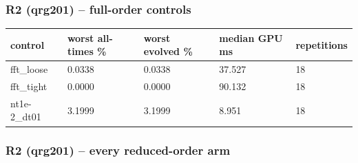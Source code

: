 \documentclass[11pt]{article}
\begin{document}
\subsubsection{R2 (qrg201) -- full-order controls}
\begin{table}[htbp]\centering\small
\begin{tabular}{lllll}\hline
control & worst all-times \% & worst evolved \% & median GPU ms & repetitions \\ \hline
fft\_loose & 0.0338 & 0.0338 & 37.527 & 18 \\
fft\_tight & 0.0000 & 0.0000 & 90.132 & 18 \\
nt1e-2\_dt01 & 3.1999 & 3.1999 & 8.951 & 18 \\
\hline\end{tabular}
\end{table}
\subsubsection{R2 (qrg201) -- every reduced-order arm}
\end{document}
